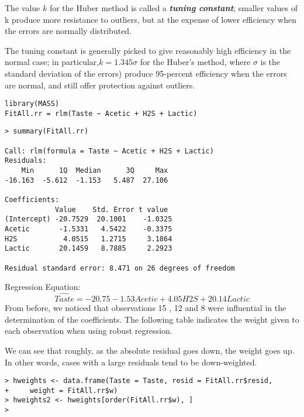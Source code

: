 The value $k$ for the Huber method is called a \textbf{\textit{tuning constant}}; smaller values of k produce more resistance to outliers, but at the expense of lower efficiency when the errors are normally distributed.

The tuning constant is generally picked to give reasonably high efficiency in the normal case; in particular,$ k = 1.345\sigma$ for the Huber’s method, where $\sigma$ is the standard deviation of the errors) produce 95-percent efficiency when the errors are normal, and still offer protection against outliers.


\begin{framed}
\begin{verbatim}
library(MASS)
FitAll.rr = rlm(Taste ~ Acetic + H2S + Lactic)
\end{verbatim}
\end{framed}

\begin{verbatim}
> summary(FitAll.rr)

Call: rlm(formula = Taste ~ Acetic + H2S + Lactic)
Residuals:
    Min      1Q  Median      3Q     Max 
-16.163  -5.612  -1.153   5.487  27.106 

Coefficients:
            Value    Std. Error t value 
(Intercept) -20.7529  20.1001    -1.0325
Acetic       -1.5331   4.5422    -0.3375
H2S           4.0515   1.2715     3.1864
Lactic       20.1459   8.7885     2.2923

Residual standard error: 8.471 on 26 degrees of freedom
\end{verbatim}

Regression Equation: 
\[ \hat{Taste} = -20.75 -1.53 Acetic + 4.05 H2S + 20.14 Lactic\]
From before, we noticed that observations 15 , 12 and 8 were influential in the determination of the coefficients. The following table indicates the weight given to each observation when using robust regression.  

We can see that roughly, as the absolute residual goes down, the weight goes up. In other words, cases with a large residuals tend to be down-weighted.


\begin{framed}
\begin{verbatim}
> hweights <- data.frame(Taste = Taste, resid = FitAll.rr$resid,
+     weight = FitAll.rr$w)
> hweights2 <- hweights[order(FitAll.rr$w), ]
>
\end{verbatim}
\end{framed}

